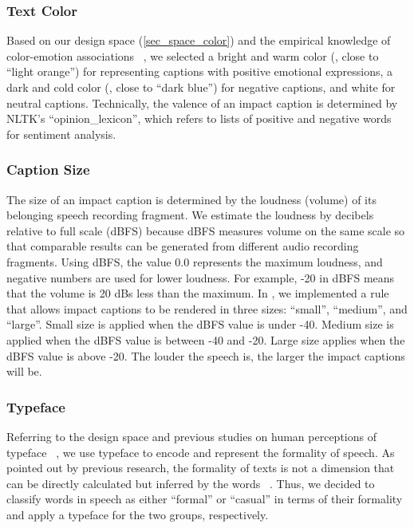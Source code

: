 \subsubsection{Text Color}
Based on our design space (\autoref{sec_space_color}) and the empirical knowledge of color-emotion associations ~\cite{wilms2018color, hanada2018correspondence, plutchik2013theories}, we selected a bright and warm color ({\textcolor[rgb]{1.0,0.82,0.26}{\faSquare}}, close to ``light orange'') for representing captions with positive emotional expressions, a dark and cold color ({\textcolor[rgb]{0.09,0.27,0.61}{\faSquare}}, close to ``dark blue'') for negative captions, and white for neutral captions. 
Technically, the valence of an impact caption is determined by NLTK's ``opinion\_lexicon'', which refers to lists of positive and negative words for sentiment analysis.

\subsubsection{Caption Size}
The size of an impact caption is determined by the loudness (volume) of its belonging speech recording fragment. We estimate the loudness by decibels relative to full scale (dBFS) because dBFS measures volume on the same scale so that comparable results can be generated from different audio recording fragments. Using dBFS, the value 0.0 represents the maximum loudness, and negative numbers are used for lower loudness. For example, -20 in dBFS means that the volume is 20 dBs less than the maximum.
In \system{}, we implemented a rule that allows impact captions to be rendered in three sizes: ``small'', ``medium'', and ``large''. Small size is applied when the dBFS value is under -40. Medium size is applied when the dBFS value is between -40 and -20. Large size applies when the dBFS value is above -20. The louder the speech is, the larger the impact captions will be.

\subsubsection{Typeface}
Referring to the design space and previous studies on human perceptions of typeface ~\cite{bianchi2021emotional, amare2012seeing}, we use typeface to encode and represent the formality of speech. 
As pointed out by previous research, the formality of texts is not a dimension that can be directly calculated but inferred by the words ~\cite{heylighen1999formality}.
Thus, we decided to classify words in speech as either ``formal'' or ``casual'' in terms of their formality and apply a typeface for the two groups, respectively.

